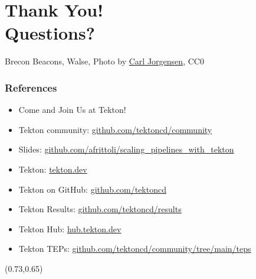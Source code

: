 \documentclass[aspectratio=169,11pt,hyperref={colorlinks=true}]{beamer}
\begin{document}
\section[Q\&A]{Thank You! \\Questions?}

\begin{sectionwithpiclargecentral}{Brecon Beacons, Walse, Photo by \href{https://unsplash.com/@scamartist}{\underline{Carl Jorgensen}}, CC0}
\end{sectionwithpiclargecentral}

\begin{blackframe}
  \frametitle{References}
  \begin{itemize}
    \item \large Come and Join Us at Tekton!
    \item \normalsize Tekton community: \href{https://github.com/tektoncd/community}{github.com/tektoncd/community} \\
  \end{itemize}
  \begin{itemize}
    \item Slides: \href{https://github.com/afrittoli/scaling_pipelines_with_tekton/blob/cdcon2021/scaling_pipelines_with_tekton.pdf}{github.com/afrittoli/scaling\_pipelines\_with\_tekton}
    \item Tekton: \href{https://tekton.dev}{tekton.dev}
    \item Tekton on GitHub: \href{https://github.com/tektoncd}{github.com/tektoncd}
    \item Tekton Results: \href{https://github.com/tektoncd/results}{github.com/tektoncd/results}
    \item Tekton Hub: \href{https://hub.tekton.dev}{hub.tekton.dev}
    \item Tekton TEPs: \href{https://github.com/tektoncd/community/tree/main/teps}{github.com/tektoncd/community/tree/main/teps}
  \end{itemize}
  \begin{textblock*}{0.13\paperwidth}(0.73\paperwidth,0.65\paperheight)
    
  \end{textblock*}
\end{blackframe}
\end{document}
